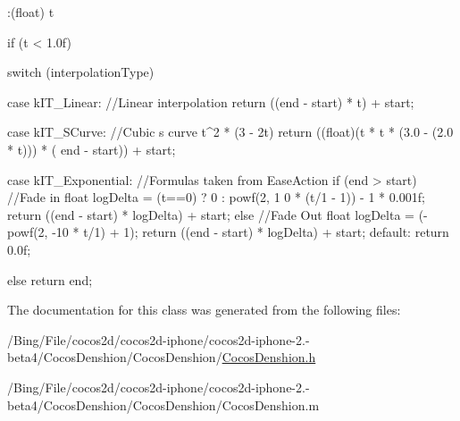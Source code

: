 \begin{DoxyCode}
                    :(float) t {

        if (t < 1.0f) {
                switch (interpolationType) {
                        case kIT_Linear:
                                //Linear interpolation
                                return ((end - start) * t) + start;

                        case kIT_SCurve:
                                //Cubic s curve t^2 * (3 - 2t)
                                return ((float)(t * t * (3.0 - (2.0 * t))) * (
      end - start)) + start;

                        case kIT_Exponential:
                                //Formulas taken from EaseAction
                                if (end > start) {
                                        //Fade in
                                        float logDelta = (t==0) ? 0 : powf(2, 1
      0 * (t/1 - 1)) - 1 * 0.001f;
                                        return ((end - start) * logDelta) + 
      start;
                                } else {
                                        //Fade Out
                                        float logDelta = (-powf(2, -10 * t/1) +
       1);
                                        return ((end - start) * logDelta) + 
      start;
                                }
                        default:
                                return 0.0f;
                }
        } else {
                return end;
        }
}
\end{DoxyCode}


The documentation for this class was generated from the following files\-:\begin{DoxyCompactItemize}
\item 
/\-Bing/\-File/cocos2d/cocos2d-\/iphone/cocos2d-\/iphone-\/2.-\/beta4/\-Cocos\-Denshion/\-Cocos\-Denshion/\hyperlink{_cocos_denshion_8h}{Cocos\-Denshion.\-h}\item 
/\-Bing/\-File/cocos2d/cocos2d-\/iphone/cocos2d-\/iphone-\/2.-\/beta4/\-Cocos\-Denshion/\-Cocos\-Denshion/Cocos\-Denshion.\-m\end{DoxyCompactItemize}
